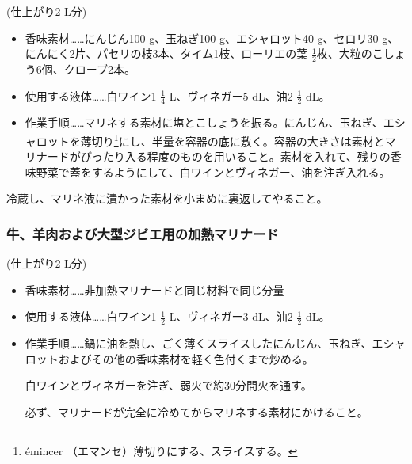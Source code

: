 \begin{recette}
(仕上がり2 L分)

\begin{itemize}
\item
  香味素材\ldots{}\ldots{}にんじん100 g、玉ねぎ100 g、エシャロット40
  g、セロリ30 g、にんにく2片、パセリの枝3本、タイム1枝、ローリエの葉
  \(\frac{1}{2}\)枚、大粒のこしょう6個、クローブ2本。
\item
  使用する液体\ldots{}\ldots{}白ワイン1 \(\frac{1}{4}\) L、ヴィネガー5
  dL、油2 \(\frac{1}{2}\) dL。
\item
  作業手順\ldots{}\ldots{}マリネする素材に塩とこしょうを振る。にんじん、玉ねぎ、エシャロットを薄切り\footnote{émincer
    （エマンセ）薄切りにする、スライスする。}にし、半量を容器の底に敷く。容器の大きさは素材とマリナードがぴったり入る程度のものを用いること。素材を入れて、残りの香味野菜で蓋をするようにして、白ワインとヴィネガー、油を注ぎ入れる。
\end{itemize}

冷蔵し、マリネ液に漬かった素材を小まめに裏返してやること。

\atoaki{}

\hypertarget{marinade-cuite-pour-viandes-de-boucherie-ou-venaison}{%
\subsubsection{牛、羊肉および大型ジビエ用の加熱マリナード}\label{marinade-cuite-pour-viandes-de-boucherie-ou-venaison}}



(仕上がり2 L分)

\begin{itemize}
\item
  香味素材\ldots{}\ldots{}非加熱マリナードと同じ材料で同じ分量
\item
  使用する液体\ldots{}\ldots{}白ワイン1 \(\frac{1}{2}\) L、ヴィネガー3
  dL、油2 \(\frac{1}{2}\) dL。
\item
  作業手順\ldots{}\ldots{}鍋に油を熱し、ごく薄くスライスしたにんじん、玉ねぎ、エシャロットおよびその他の香味素材を軽く色付くまで炒める。

  白ワインとヴィネガーを注ぎ、弱火で約30分間火を通す。

  必ず、マリナードが完全に冷めてからマリネする素材にかけること。
\end{itemize}


\end{recette}
